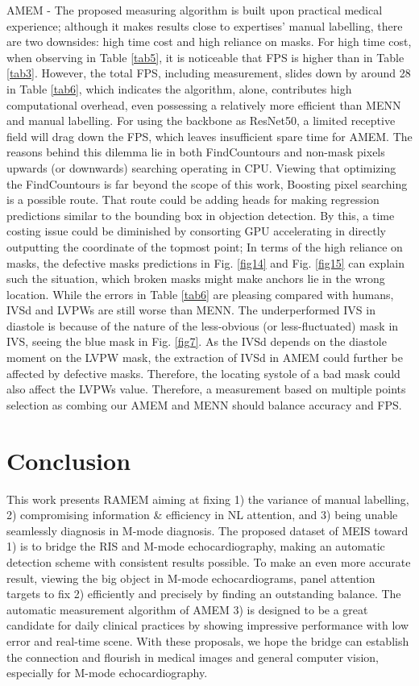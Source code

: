 \documentclass{article}
\begin{document}
AMEM - The proposed measuring algorithm is built upon practical medical experience; although it makes results close to expertises' manual labelling, there are two downsides: high time cost and high reliance on masks. For high time cost, when observing in Table \ref{tab5}, it is noticeable that FPS is higher than in Table \ref{tab3}. However, the total FPS, including measurement, slides down by around 28 in Table \ref{tab6}, which indicates the algorithm, alone, contributes high computational overhead, even possessing a relatively more efficient than MENN and manual labelling. For using the backbone as ResNet50, a limited receptive field will drag down the FPS, which leaves insufficient spare time for AMEM. The reasons behind this dilemma lie in both FindCountours and non-mask pixels upwards (or downwards) searching operating in CPU. Viewing that optimizing the FindCountours is far beyond the scope of this work, Boosting pixel searching is a possible route. That route could be adding heads for making regression predictions similar to the bounding box in objection detection. By this, a time costing issue could be diminished by consorting GPU accelerating in directly outputting the coordinate of the topmost point; In terms of the high reliance on masks, the defective masks predictions in Fig. \ref{fig14} and Fig. \ref{fig15} can explain such the situation, which broken masks might make anchors lie in the wrong location. While the errors in Table \ref{tab6} are pleasing compared with humans, IVSd and LVPWs are still worse than MENN. The underperformed IVS in diastole is because of the nature of the less-obvious (or less-fluctuated) mask in IVS, seeing the blue mask in Fig. \ref{fig7}. As the IVSd depends on the diastole moment on the LVPW mask, the extraction of IVSd in AMEM could further be affected by defective masks. Therefore, the locating systole of a bad mask could also affect the LVPWs value. Therefore, a measurement based on multiple points selection as combing our AMEM and MENN should balance accuracy and FPS.

\section{Conclusion}
\label{sec6}
This work presents RAMEM aiming at fixing 1) the variance of manual labelling, 2) compromising information \& efficiency in NL attention, and 3) being unable seamlessly diagnosis in M-mode diagnosis. The proposed dataset of MEIS toward 1) is to bridge the RIS and M-mode echocardiography, making an automatic detection scheme with consistent results possible. To make an even more accurate result, viewing the big object in M-mode echocardiograms, panel attention targets to fix 2) efficiently and precisely by finding an outstanding balance. The automatic measurement algorithm of AMEM 3) is designed to be a great candidate for daily clinical practices by showing impressive performance with low error and real-time scene. With these proposals, we hope the bridge can establish the connection and flourish in medical images and general computer vision, especially for M-mode echocardiography.
\end{document}
